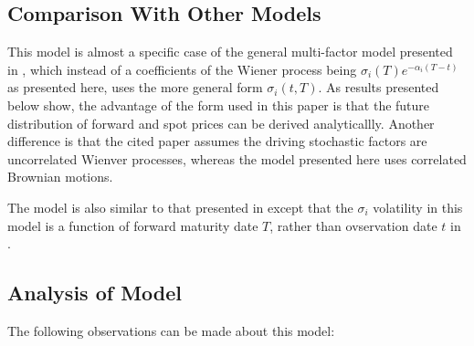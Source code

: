 \documentclass{article}
\begin{document}
\subsection{Comparison With Other Models}

This model is almost a specific case of the general multi-factor model presented
in \cite{Clewlow}, which instead of a coefficients of the Wiener process being
$\sigma_i(T)e^{-\alpha_i(T-t)}$ as presented here, uses the more general form
$\sigma_i(t, T)$. As results presented below show, the advantage of the form
used in this paper is that the future distribution of forward and spot prices
can be derived analyticallly. Another difference is that the cited paper assumes 
the driving stochastic factors
are uncorrelated Wienver processes, whereas the model presented here uses correlated
Brownian motions.

\bigskip

The model is also similar to that presented in \cite{Warin} except that the $\sigma_i$
volatility in this model is a function of forward maturity date $T$, rather than
ovservation date $t$ in \cite{Warin}.

\subsection{Analysis of Model}
The following observations can be made about this model:
\end{document}

